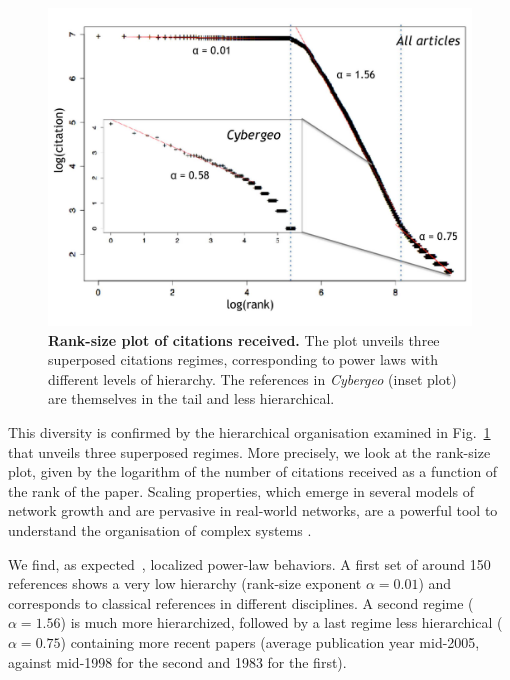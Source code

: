 \begin{figure}
\centering
\includegraphics[width=\textwidth]{figures/Fig3.jpg}
\caption{\textbf{Rank-size plot of citations received.} The plot unveils three superposed citations regimes, corresponding to power laws with different levels of hierarchy. The references in \textit{Cybergeo} (inset plot) are themselves in the tail and less hierarchical.}
\label{fig:ranksize}
\end{figure}


This diversity is confirmed by the hierarchical organisation examined in Fig.~\ref{fig:ranksize} that unveils three superposed regimes. More precisely, we look at the rank-size plot, given by the logarithm of the number of citations received as a function of the rank of the paper. Scaling properties, which emerge in several models of network growth and are pervasive in real-world networks, are a powerful tool to understand the organisation of complex systems \citep{Barabasi509}.

We find, as expected~\citep{redner1998popular}, localized power-law behaviors. A first set of around 150 references shows a very low hierarchy (rank-size exponent $\alpha = 0.01$) and corresponds to classical references in different disciplines. A second regime ($\alpha = 1.56$) is much more hierarchized, followed by a last regime less hierarchical ($\alpha = 0.75$) containing more recent papers (average publication year mid-2005, against mid-1998 for the second and 1983 for the first).



